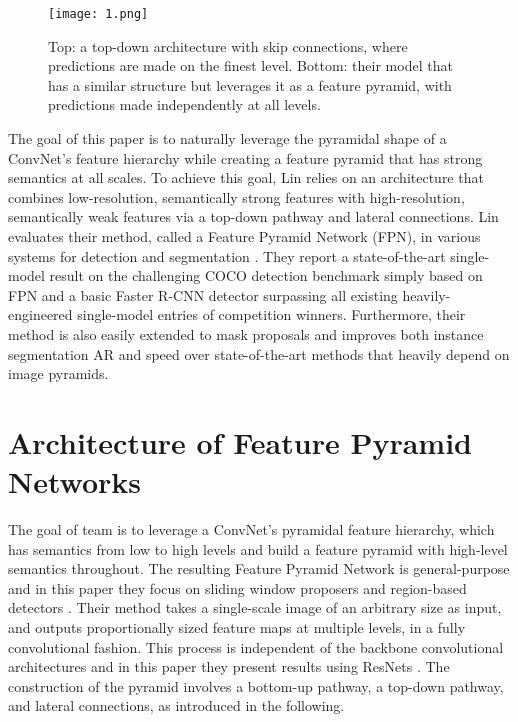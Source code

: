 \documentclass[10pt,twocolumn,letterpaper]{article}
\begin{document}
\begin{figure}
	\begin{center}
		\texttt{[image: 1.png]}
	\end{center}
	\caption{Top: a top-down architecture with skip connections, where predictions are made on the finest level. Bottom: their model that has a similar structure but leverages it as a feature pyramid, with predictions made independently at all levels.}
	\label{fig:1}
\end{figure}

The goal of this paper is to naturally leverage the pyramidal shape of a ConvNet’s feature hierarchy while creating a feature pyramid that has strong semantics at all scales. To achieve this goal, Lin relies on an architecture that combines low-resolution, semantically strong features with high-resolution, semantically weak features via a top-down pathway and lateral connections. Lin evaluates their method, called a Feature Pyramid Network (FPN), in various systems for detection and segmentation \cite{lin2017feature}. They report a state-of-the-art single-model result on the challenging COCO detection benchmark \cite{lin2014microsoft} simply based on FPN and a basic Faster R-CNN detector surpassing all existing heavily-engineered single-model entries of competition winners. Furthermore, their method is also easily extended to mask proposals and improves both instance segmentation AR and speed over state-of-the-art methods that heavily depend on image pyramids.

\section{Architecture of Feature Pyramid Networks}

The goal of team is to leverage a ConvNet's pyramidal feature hierarchy, which has semantics from low to high levels and build a feature pyramid with high-level semantics throughout. The resulting Feature Pyramid Network is general-purpose and in this paper they focus on sliding window proposers \cite{ren2015faster} and region-based detectors \cite{girshick2015fast}. Their method takes a single-scale image of an arbitrary size as input, and outputs proportionally sized feature maps at multiple levels, in a fully convolutional fashion. This process is independent of the backbone convolutional architectures and in this paper they present results using ResNets \cite{he2016deep}. The construction of the pyramid involves a bottom-up pathway, a top-down pathway, and lateral connections, as introduced in the following. 
\end{document}
